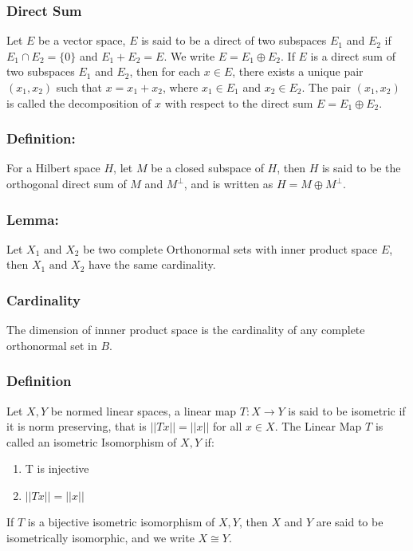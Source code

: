 \documentclass[12pt]{article}
\begin{document}
\subsubsection*{Direct Sum}
Let $E$ be a vector space, $E$ is said to be a direct of two subspaces $E_1$ and $E_2$ if $E_1 \cap E_2 = \{0\}$ and $E_1 + E_2 = E$. We write $E = E_1 \oplus E_2$. If $E$ is a direct sum of two subspaces $E_1$ and $E_2$, then for each $x \in E$, there exists a unique pair $(x_1,x_2)$ such that $x = x_1 + x_2$, where $x_1 \in E_1$ and $x_2 \in E_2$. The pair $(x_1,x_2)$ is called the decomposition of $x$ with respect to the direct sum $E = E_1 \oplus E_2$.

\subsubsection*{Definition:}
For a Hilbert space $H$, let $M$ be a closed subspace of $H$, then $H$ is said to be the orthogonal direct sum of $M$ and $M^{\perp}$, and is written as $H = M \oplus M^{\perp}$.

\subsubsection*{Lemma:}
Let $X_1$ and $X_2$ be two complete Orthonormal sets with inner product space $E$, then $X_1 \text{ and } X_2$ have the same cardinality.

\subsubsection*{Cardinality}
The dimension of innner product space is the cardinality of any complete orthonormal set in $B$.
\subsubsection*{Definition}
Let $X,Y$ be normed linear spaces, a linear map $T: X \to Y$ is said to be isometric if it is norm preserving, that is $||Tx|| = ||x||$ for all $x \in X$.
\newline
The Linear Map $T$ is called an isometric Isomorphism of $X,Y$ if:
\begin{enumerate}
    \item T is injective
    \item $||Tx|| = ||x||$
\end{enumerate}
If $T$ is a bijective isometric isomorphism of $X,Y$, then $X$ and $Y$ are said to be isometrically isomorphic, and we write $X \cong Y$.
\end{document}
